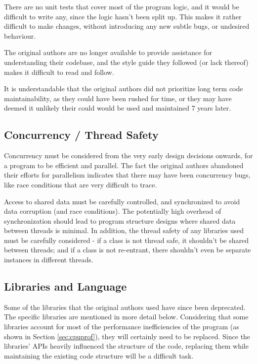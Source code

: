 There are no unit tests that cover most of the program logic, and it would be difficult to write any, since the logic hasn't been split up. This makes it rather difficult to make changes, without introducing any new subtle bugs, or undesired behaviour.

The original authors are no longer available to provide assistance for understanding their codebase, and the style guide they followed (or lack thereof) makes it difficult to read and follow.

It is understandable that the original authors did not prioritize long term code maintainability, as they could have been rushed for time, or they may have deemed it unlikely their could would be used and maintained 7 years later.

\subsection{Concurrency / Thread Safety}

Concurrency must be considered from the very early design decisions onwards, for a program to be efficient and parallel. The fact the original authors abandoned their efforts for parallelism indicates that there may have been concurrency bugs, like race conditions \autocite{raceconditions} that are very difficult to trace.

Access to shared data must be carefully controlled, and synchronized to avoid data corruption (and race conditions). The potentially high overhead of synchronization should lead to program structure designs where shared data between threads is minimal. In addition, the thread safety of any libraries used must be carefully considered - if a class is not thread safe, it shouldn't be shared  between threads; and if a class is not re-entrant, there shouldn't even be separate instances in different threads.

\subsection{Libraries and Language}
\label{sec:libs}
Some of the libraries that the original authors used have since been deprecated. The specific libraries are mentioned in more detail below. Considering that some libraries account for most of the performance inefficiencies of the program (as shown in Section \ref{sec:cpuprof}), they will certainly need to be replaced. Since the libraries' APIs heavily influenced the structure of the code, replacing them while maintaining the existing code structure will be a difficult task.

